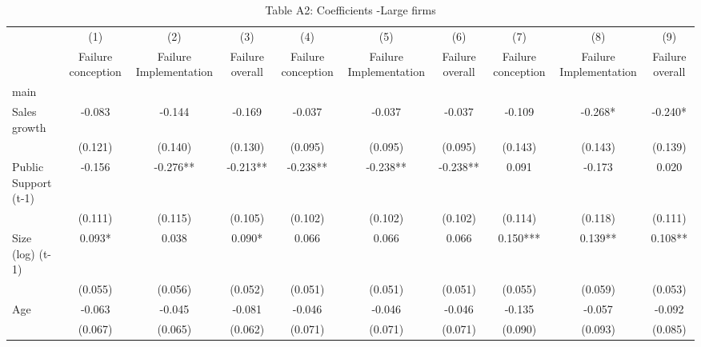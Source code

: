 \begin{table}[htbp]\centering
\def\sym#1{\ifmmode^{#1}\else\(^{#1}\)\fi}
\caption{{Table A2: Coefficients -Large firms}}
\begin{tabular}{l*{9}{c}}
\hline\hline
                    &\multicolumn{1}{c}{(1)}&\multicolumn{1}{c}{(2)}&\multicolumn{1}{c}{(3)}&\multicolumn{1}{c}{(4)}&\multicolumn{1}{c}{(5)}&\multicolumn{1}{c}{(6)}&\multicolumn{1}{c}{(7)}&\multicolumn{1}{c}{(8)}&\multicolumn{1}{c}{(9)}\\
                    &\multicolumn{1}{c}{Failure conception}&\multicolumn{1}{c}{Failure Implementation}&\multicolumn{1}{c}{Failure overall}&\multicolumn{1}{c}{Failure conception}&\multicolumn{1}{c}{Failure Implementation}&\multicolumn{1}{c}{Failure overall}&\multicolumn{1}{c}{Failure conception}&\multicolumn{1}{c}{Failure Implementation}&\multicolumn{1}{c}{Failure overall}\\
\hline
main                &               &               &               &               &               &               &               &               &               \\
Sales growth        &      -0.083   &      -0.144   &      -0.169   &      -0.037   &      -0.037   &      -0.037   &      -0.109   &      -0.268*  &      -0.240*  \\
                    &     (0.121)   &     (0.140)   &     (0.130)   &     (0.095)   &     (0.095)   &     (0.095)   &     (0.143)   &     (0.143)   &     (0.139)   \\
Public Support (t-1)&      -0.156   &      -0.276** &      -0.213** &      -0.238** &      -0.238** &      -0.238** &       0.091   &      -0.173   &       0.020   \\
                    &     (0.111)   &     (0.115)   &     (0.105)   &     (0.102)   &     (0.102)   &     (0.102)   &     (0.114)   &     (0.118)   &     (0.111)   \\
Size (log) (t-1)    &       0.093*  &       0.038   &       0.090*  &       0.066   &       0.066   &       0.066   &       0.150***&       0.139** &       0.108** \\
                    &     (0.055)   &     (0.056)   &     (0.052)   &     (0.051)   &     (0.051)   &     (0.051)   &     (0.055)   &     (0.059)   &     (0.053)   \\
Age                 &      -0.063   &      -0.045   &      -0.081   &      -0.046   &      -0.046   &      -0.046   &      -0.135   &      -0.057   &      -0.092   \\
                    &     (0.067)   &     (0.065)   &     (0.062)   &     (0.071)   &     (0.071)   &     (0.071)   &     (0.090)   &     (0.093)   &     (0.085)   \\

\end{tabular}
\end{table}

